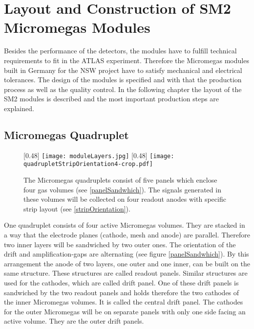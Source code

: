 \documentclass[
twoside,            %
BCOR1.4cm,          %
10pt,               %
headings=normal,    %
headsepline,        %
clearplainpage,		%
final,              %
div=14,
open=right,
bibliography=toc
]{scrreprt}
\begin{document}
\chapter{Layout and Construction of SM2 Micromegas Modules}

Besides the performance of the detectors, the modules have to fulfill technical requirements to fit in the ATLAS experiment.
Therefore the Micromegas modules built in Germany for the NSW project have to satisfy mechanical and electrical tolerances.
The design of the modules is specified and with that the production process as well as the quality control.
In the following chapter the layout of the SM2 modules is described and the most important production steps are explained.

\section{Micromegas Quadruplet}

\begin{figure}[!h]
	\centering
	[0.48\textwidth]
	{\texttt{[image: moduleLayers.jpg]}}
	\hfill
	[0.48\textwidth]
	{\texttt{[image: quadrupletStripOrientation4-crop.pdf]}}
	\vspace{-2mm}
	\caption{
		The Micromegas quadruplets consist of five panels which enclose four gas volumes (see \ref{panelSandwhich}).
		The signals generated in these volumes will be collected on four readout anodes with specific strip layout (see \ref{stripOrientation}).
	}
\end{figure}

One quadruplet consists of four active Micromegas volumes.
They are stacked in a way that the electrode planes (cathode, mesh and anode) are parallel.
Therefore two inner layers will be sandwiched by two outer ones.
The orientation of the drift and amplification-gaps are alternating (see figure \ref{panelSandwhich}).
By this arrangement the anode of two layers, one outer and one inner, can be built on the same structure.
These structures are called readout panels.
Similar structures are used for the cathodes, which are called drift panel.
One of these drift panels is sandwiched by the two readout panels and holds therefore the two cathodes of the inner Micromegas volumes.
It is called the central drift panel.
The cathodes for the outer Micromegas will be on separate panels with only one side facing an active volume.
They are the outer drift panels.
\end{document}
